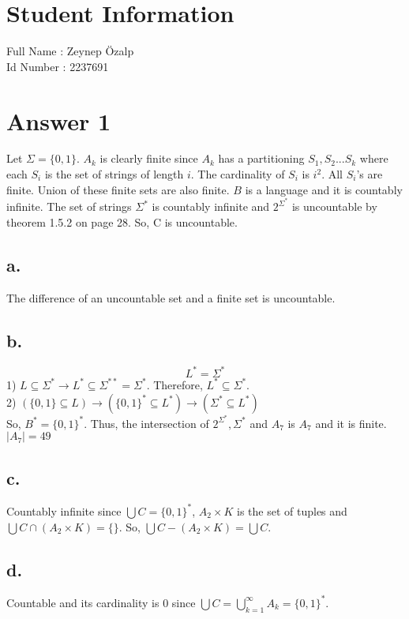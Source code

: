 \documentclass[12pt]{article}
\begin{document}
\section*{Student Information} 
Full Name : Zeynep Özalp \\
Id Number : 2237691 \\

\section*{Answer 1}
Let $\Sigma=\{0,1\}$. $A_k$ is clearly finite since $A_k$ has a partitioning $S_1,S_2...S_k$ where each $S_i$ is the set of strings of length $i$. The cardinality of $S_i$ is $i^2$. All $S_i$'s are finite. Union of these finite sets are also finite. $B$ is a language and it is countably infinite. The set of strings $\Sigma^*$ is countably infinite and $2^{\Sigma^*}$ is uncountable by theorem 1.5.2 on page 28. So, C is uncountable. 
\subsection*{a.}
The difference of an uncountable set and a finite set is uncountable.
\subsection*{b.}
$$L^*=\Sigma^*$$
1) $L\subseteq\Sigma^* \rightarrow L^*\subseteq \Sigma^{**}=\Sigma^*$. Therefore, $ L^*\subseteq \Sigma^*$.\\
2) $(\{0,1\}\subseteq L) \rightarrow (\{0,1\}^* \subseteq L^*) \rightarrow (\Sigma^* \subseteq L^*)$\\

So, $B^*=\{0,1\}^*$. Thus, the intersection of $2^{\Sigma^*}, \Sigma^*$ and $A_7$ is $A_7$ and it is finite. $|A_7|=49$
\subsection*{c.}
Countably infinite since $\bigcup C =\{0,1\}^*$, $A_2 \times K$ is the set of tuples and $\bigcup C \cap (A_2 \times K) = \{\} $. So, $\bigcup C - (A_2 \times K) = \bigcup C$.
\subsection*{d.}
Countable and its cardinality is 0 since $\bigcup C =\bigcup _{k=1}^\infty A_k=\{0,1\}^*$.
\end{document}

